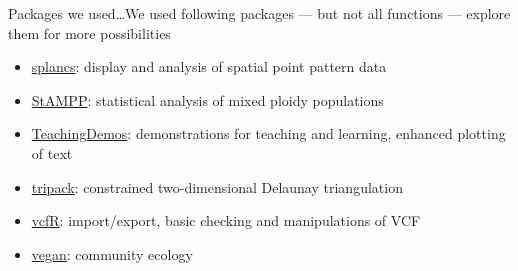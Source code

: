 \documentclass[compress, xelatex, 11pt, xcolor=svgnames, aspectratio=169,
	hyperref={
		bookmarks=true,
		unicode=true,
		colorlinks=true,
		pdftitle={Molecular data in R},
		plainpages=false,
		pdfauthor={Vojtech Zeisek},
		pdfsubject={Course about phylogeny and evolution in R},
		pdfcreator={XeLaTeX},
		pdfkeywords={R, evolution, phylogeny, molecular data},
		linkcolor=Crimson, %
		anchorcolor=Magenta, %
		citecolor=Magenta, %
		filecolor=Magenta, %
		menucolor=Magenta, %
		urlcolor=DodgerBlue, %
		},
	url={hyphens, lowtilde} %
	]{beamer}
\begin{document}
\begin{frame}[allowframebreaks]{Packages we used\ldots}{We used following packages --- but not all functions --- explore them for more possibilities}
\begin{itemize}
		\item \href{https://CRAN.R-project.org/package=splancs}{splancs}: display and analysis of spatial point pattern data
		\item \href{https://CRAN.R-project.org/package=StAMPP}{StAMPP}: statistical analysis of mixed ploidy populations
		\item \href{https://CRAN.R-project.org/package=TeachingDemos}{TeachingDemos}: demonstrations for teaching and learning, enhanced plotting of text
		\item \href{https://CRAN.R-project.org/package=tripack}{tripack}: constrained two-dimensional Delaunay triangulation
		\item \href{https://CRAN.R-project.org/package=vcfR}{vcfR}: import/export, basic checking and manipulations of VCF
		\item \href{https://CRAN.R-project.org/package=vegan}{vegan}: community ecology
	\end{itemize}
\end{frame}
\end{document}
